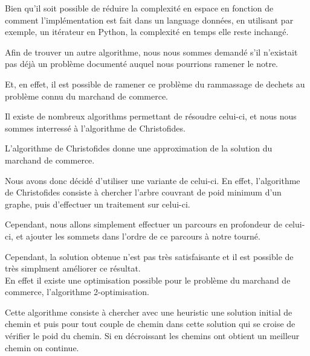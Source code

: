\documentclass{report}
\begin{document}
  Bien qu'il soit possible de réduire la complexité en espace en fonction de comment l'implémentation est fait dans un language données, en utilisant par exemple, un itérateur en Python, la complexité en temps elle reste inchangé.

  Afin de trouver un autre algorithme, nous nous sommes demandé s'il n'existait pas déjà un problème documenté auquel nous pourrions ramener le notre.

  Et, en effet, il est possible de ramener ce problème du rammassage de dechets au problème connu du marchand de commerce.

  Il existe de nombreux algorithms permettant de résoudre celui-ci, et nous nous sommes interressé à l'algorithme de Christofides.
  
  L'algorithme de Christofides donne une approximation de la solution du marchand de commerce.

  Nous avons donc décidé d'utiliser une variante de celui-ci. En effet, l'algorithme de Christofides consiste à chercher l'arbre couvrant de poid minimum d'un graphe, puis d'effectuer un traitement sur celui-ci.


  Cependant, nous allons simplement effectuer un parcours en profondeur de celui-ci, et ajouter les sommets dans l'ordre de ce parcours à notre tourné.


  Cependant, la solution obtenue n'est pas très satisfaisante et il est possible de très simplment améliorer ce résultat. \\ 

  En effet il existe une optimisation possible pour le problème du marchand de commerce, l'algorithme 2-optimisation.

  Cette algorithme consiste à chercher avec une heuristic une solution initial de chemin et puis pour tout couple de chemin dans cette solution qui se croise de vérifier le poid du chemin. Si en décroissant les chemins ont obtient un meilleur chemin on continue.
\end{document}
